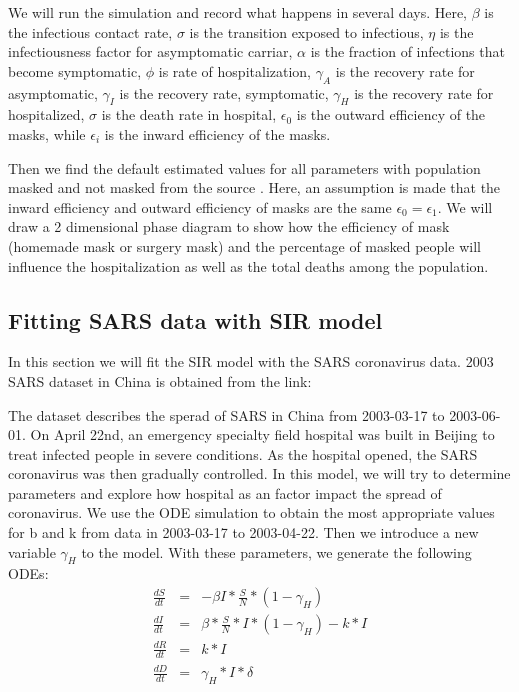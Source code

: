 \documentclass{article}
\begin{document}
We will run the simulation and record what happens in several days. Here, $\beta$ is the infectious contact rate, $\sigma$ is the transition exposed to infectious, $\eta$ is the infectiousness factor for asymptomatic carriar, $\alpha$ is the fraction of infections that become symptomatic, $\phi$ is rate of hospitalization, $\gamma_{A}$ is the recovery rate for asymptomatic, $\gamma_{I}$ is the recovery rate, symptomatic, $\gamma_{H}$ is the recovery rate for hospitalized, $\sigma$ is the death rate in hospital, $\epsilon_{0}$ is the outward efficiency of the masks, while $\epsilon_{i}$ is the inward efficiency of the masks.

Then we find the default estimated values for all parameters with population masked and not masked from the source \cite{Steff2020mask}. Here, an assumption is made that the inward efficiency and outward efficiency of masks are the same $\epsilon_{0} = \epsilon_{1}$. We will draw a 2 dimensional phase diagram to show how the efficiency of mask (homemade mask or surgery mask) and the percentage of masked people will influence the hospitalization as well as the total deaths among the population.






\subsection{Fitting SARS data with SIR model}
In this section we will fit the SIR model with the SARS coronavirus data. 2003 SARS dataset in China is obtained from the link:\cite{SARSsource}

The dataset describes the sperad of SARS in China from 2003-03-17 to 2003-06-01. On April 22nd, an emergency specialty field hospital was built in Beijing to treat infected people in severe conditions. As the hospital opened, the SARS coronavirus was then gradually controlled. In this model, we will try to determine parameters and explore how hospital as an factor impact the spread of coronavirus. We use the ODE simulation to obtain the most appropriate values for b and k from data in 2003-03-17 to 2003-04-22. Then we introduce a new variable $\gamma_{H}$ to the model. With these parameters, we generate the following ODEs:
\begin{eqnarray}
  \frac{dS}{dt} &=& -\beta I*\frac{S}{N}*(1-\gamma_{H})\\
  \frac{dI}{dt} &=& \beta *\frac{S}{N}*I*(1-\gamma_{H})- k*I\\
  \frac{dR}{dt} &=& k*I\\
  \frac{dD}{dt} &=& \gamma_{H}*I*\delta\\
\end{eqnarray}
\end{document}

